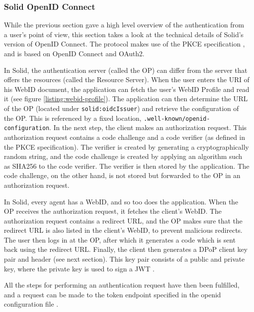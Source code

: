 \subsubsection{Solid OpenID Connect}
\label{sec:solid-oidc}
While the previous section gave a high level overview of the authentication from a user's point of view, this section takes a look at the technical details of Solid's version of OpenID Connect. The protocol makes use of the \acrshort{PKCE} specification \citep{pkce}, and is based on OpenID Connect and OAuth2.

In Solid, the authentication server (called the \gls{OP}) can differ from the server that offers the resources (called the Resource Server).  When the user enters the URI of his WebID document, the application can fetch the user's WebID Profile and read it (see figure \ref{listing:webid-profile}). The application can then determine the URL of the \acrfull{OP} (located under \texttt{solid:oidcIssuer}) and retrieve the configuration of the \gls{OP}. This is referenced by a fixed location, \texttt{.well-known/openid-configuration}. 
In the next step, the client makes an authorization request. This authorization request contains a code challenge and a code verifier (as defined in the \acrshort{PKCE} specification). The verifier is created by generating a cryptographically random string, and the code challenge is created by applying an algorithm such as SHA256 to the code verifier. The verifier is then stored by the application. The code challenge, on the other hand, is not stored but forwarded to the \gls{OP} in an authorization request. 

In Solid, every agent has a WebID, and so too does the application. When the \gls{OP} receives the authorization request, it fetches the client's WebID. The authorization request contains a redirect URL, and the \gls{OP} makes sure that the redirect URL is also listed in the client's WebID, to prevent malicious redirects. The user then logs in at the \gls{OP}, after which it generates a code which is sent back using the redirect URL. Finally, the client then generates a \gls{DPoP} client key pair and header (see next section). This key pair consists of a public and private key, where the private key is used to sign a \gls{JWT} \citep{JWT}.

All the steps for performing an authentication request have then been fulfilled, and a request can be made to the token endpoint specified in the openid configuration file \citep{solid-oidc-primer}. 

